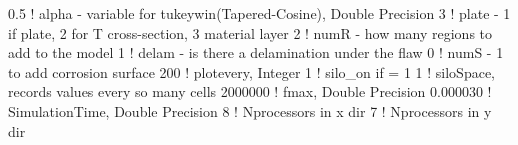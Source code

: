  0.5    ! alpha - variable for tukeywin(Tapered-Cosine), Double Precision
 3	    ! plate - 1 if plate, 2 for T cross-section, 3 material layer
 2	    ! numR - how many regions to add to the model
 1	    ! delam - is there a delamination under the flaw
 0	    ! numS - 1 to add corrosion surface
 200    ! plotevery, Integer
 1	    ! silo_on if = 1
 1 	    ! siloSpace, records values every so many cells
 2000000    ! fmax, Double Precision 
 0.000030   ! SimulationTime, Double Precision 
 8	    ! Nprocessors in x dir
 7	    ! Nprocessors in y dir
